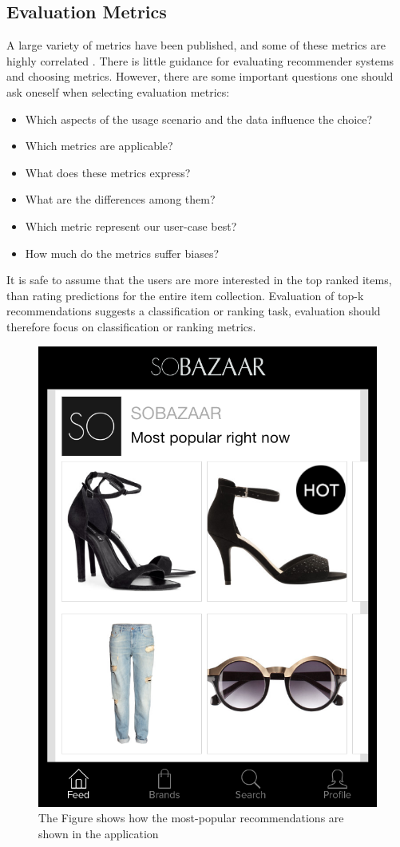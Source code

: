 

\subsection{Evaluation Metrics}



A large variety of metrics have been published, and some of these metrics are highly correlated \cite{Herlocker2004}.
There is little guidance for evaluating recommender systems and choosing metrics. However, there are
some important questions one should ask oneself when selecting evaluation metrics:

\begin{itemize}
	\item Which aspects of the usage scenario and the data influence the choice?
	\item Which metrics are applicable?
	\item What does these metrics express?
	\item What are the differences among them?
	\item Which metric represent our user-case best?
	\item How much do the metrics suffer biases?
\end{itemize}

It is safe to assume that the users are more interested in the top ranked items, than rating
predictions for the entire item collection. Evaluation of top-k recommendations suggests a
classification or ranking task, evaluation should therefore focus on classification or ranking metrics.

\begin{figure}[H]
  \centering
  \includegraphics[height=.5\linewidth]{image/SoBazaarmostpop.png}
  \caption[SoBazaar most-popular recommendation]{The Figure shows how the most-popular recommendations are shown in the application}
\label{figure:mostpopular}
\end{figure}

